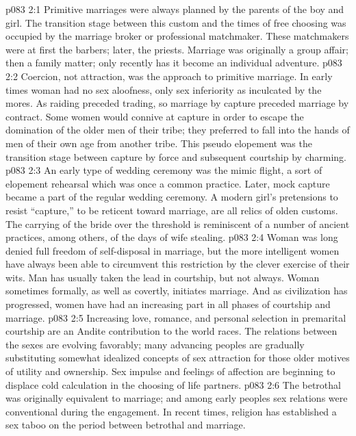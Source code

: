 \vs p083 2:1 Primitive marriages were always planned by the parents of the boy and girl. The transition stage between this custom and the times of free choosing was occupied by the marriage broker or professional matchmaker. These matchmakers were at first the barbers; later, the priests. Marriage was originally a group affair; then a family matter; only recently has it become an individual adventure.
\vs p083 2:2 Coercion, not attraction, was the approach to primitive marriage. In early times woman had no sex aloofness, only sex inferiority as inculcated by the mores. As raiding preceded trading, so marriage by capture preceded marriage by contract. Some women would connive at capture in order to escape the domination of the older men of their tribe; they preferred to fall into the hands of men of their own age from another tribe. This pseudo elopement was the transition stage between capture by force and subsequent courtship by charming.
\vs p083 2:3 An early type of wedding ceremony was the mimic flight, a sort of elopement rehearsal which was once a common practice. Later, mock capture became a part of the regular wedding ceremony. A modern girl’s pretensions to resist “capture,” to be reticent toward marriage, are all relics of olden customs. The carrying of the bride over the threshold is reminiscent of a number of ancient practices, among others, of the days of wife stealing.
\vs p083 2:4 Woman was long denied full freedom of self\hyp{}disposal in marriage, but the more intelligent women have always been able to circumvent this restriction by the clever exercise of their wits. Man has usually taken the lead in courtship, but not always. Woman sometimes formally, as well as covertly, initiates marriage. And as civilization has progressed, women have had an increasing part in all phases of courtship and marriage.
\vs p083 2:5 Increasing love, romance, and personal selection in premarital courtship are an Andite contribution to the world races. The relations between the sexes are evolving favorably; many advancing peoples are gradually substituting somewhat idealized concepts of sex attraction for those older motives of utility and ownership. Sex impulse and feelings of affection are beginning to displace cold calculation in the choosing of life partners.
\vs p083 2:6 The betrothal was originally equivalent to marriage; and among early peoples sex relations were conventional during the engagement. In recent times, religion has established a sex taboo on the period between betrothal and marriage.
